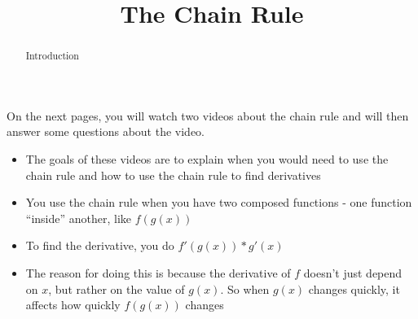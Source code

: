 \documentclass[handout]{ximera}
\title{The Chain Rule}
\begin{document}
\begin{abstract} Introduction %
\end{abstract}

\maketitle

On the next pages, you will watch two videos about the chain rule and will then answer some questions about the video.

\begin{itemize}
\item The goals of these videos are to explain when you would need to use the chain rule and how to use the chain rule to find derivatives
\item You use the chain rule when you have two composed functions - one function ``inside'' another, like $f(g(x))$
\item To find the derivative, you do $f'(g(x)) * g'(x)$
\item The reason for doing this is because the derivative of $f$ doesn’t just depend on $x$, but rather on the value of $g(x)$. So when $g(x)$ changes quickly, it affects how quickly $f(g(x))$ changes
\end{itemize}
\end{document}
